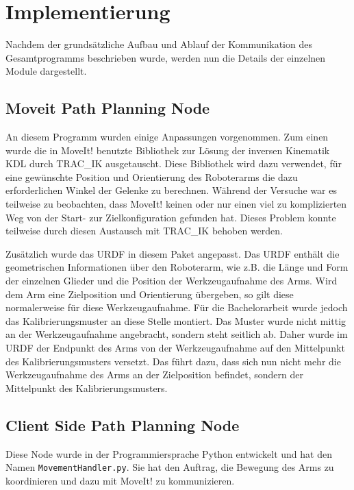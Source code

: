 \chapter{Implementierung}
\label{chap:implementierung}
Nachdem der grundsätzliche Aufbau und Ablauf der Kommunikation des Gesamtprogramms beschrieben wurde, werden nun die Details der einzelnen Module dargestellt.

\section{Moveit Path Planning Node} %
\label{sec:universal_robot_impl}

An diesem Programm wurden einige Anpassungen vorgenommen. Zum einen wurde die in MoveIt! benutzte Bibliothek zur Lösung der inversen Kinematik KDL durch TRAC\_IK ausgetauscht. Diese Bibliothek wird dazu verwendet, für eine gewünschte Position und Orientierung des Roboterarms die dazu erforderlichen Winkel der Gelenke zu berechnen. Während der Versuche war es teilweise zu beobachten, dass MoveIt! keinen oder nur einen viel zu komplizierten Weg von der Start- zur Zielkonfiguration gefunden hat. Dieses Problem konnte teilweise durch diesen Austausch mit TRAC\_IK behoben werden.

Zusätzlich wurde das URDF in diesem Paket angepasst. Das URDF enthält die geometrischen Informationen über den Roboterarm, wie z.B. die Länge und Form der einzelnen Glieder und die Position der Werkzeugaufnahme des Arms. Wird dem Arm eine Zielposition und Orientierung übergeben, so gilt diese normalerweise für diese Werkzeugaufnahme. Für die Bachelorarbeit wurde jedoch das Kalibrierungsmuster an diese Stelle montiert. Das Muster wurde nicht mittig an der Werkzeugaufnahme angebracht, sondern steht seitlich ab. Daher wurde im URDF der Endpunkt des Arms von der Werkzeugaufnahme auf den Mittelpunkt des Kalibrierungsmusters versetzt. Das führt dazu, dass sich nun nicht mehr die Werkzeugaufnahme des Arms an der Zielposition befindet, sondern der Mittelpunkt des Kalibrierungsmusters.

\section{Client Side Path Planning Node} %
\label{sec:movearmserver_impl}
Diese Node wurde in der Programmiersprache Python entwickelt und hat den Namen \texttt{MovementHandler.py}. Sie hat den Auftrag, die Bewegung des Arms zu koordinieren und dazu mit MoveIt! zu kommunizieren.

